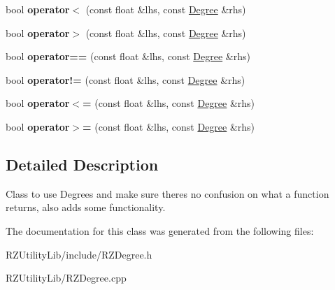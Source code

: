 \begin{DoxyCompactItemize}
\item 
\hypertarget{classrcz_engine_1_1_degree_a2efd712929fa4ee4616352fa5807cd17}{}bool {\bfseries operator$<$} (const float \&lhs, const \hyperlink{classrcz_engine_1_1_degree}{Degree} \&rhs)\label{classrcz_engine_1_1_degree_a2efd712929fa4ee4616352fa5807cd17}

\item 
\hypertarget{classrcz_engine_1_1_degree_a7eecb36960235c1f5b6e9d14a560b9e0}{}bool {\bfseries operator$>$} (const float \&lhs, const \hyperlink{classrcz_engine_1_1_degree}{Degree} \&rhs)\label{classrcz_engine_1_1_degree_a7eecb36960235c1f5b6e9d14a560b9e0}

\item 
\hypertarget{classrcz_engine_1_1_degree_a58046b347307c75d83bf84fe7f4f7163}{}bool {\bfseries operator==} (const float \&lhs, const \hyperlink{classrcz_engine_1_1_degree}{Degree} \&rhs)\label{classrcz_engine_1_1_degree_a58046b347307c75d83bf84fe7f4f7163}

\item 
\hypertarget{classrcz_engine_1_1_degree_af6076988772e4e8205d40ef0dfb4da25}{}bool {\bfseries operator!=} (const float \&lhs, const \hyperlink{classrcz_engine_1_1_degree}{Degree} \&rhs)\label{classrcz_engine_1_1_degree_af6076988772e4e8205d40ef0dfb4da25}

\item 
\hypertarget{classrcz_engine_1_1_degree_abc84808ef6d8b7052d00ebc9f472f537}{}bool {\bfseries operator$<$=} (const float \&lhs, const \hyperlink{classrcz_engine_1_1_degree}{Degree} \&rhs)\label{classrcz_engine_1_1_degree_abc84808ef6d8b7052d00ebc9f472f537}

\item 
\hypertarget{classrcz_engine_1_1_degree_a7c415e3af893572cb02eb39bcf3560f1}{}bool {\bfseries operator$>$=} (const float \&lhs, const \hyperlink{classrcz_engine_1_1_degree}{Degree} \&rhs)\label{classrcz_engine_1_1_degree_a7c415e3af893572cb02eb39bcf3560f1}

\end{DoxyCompactItemize}


\subsection{Detailed Description}
Class to use Degrees and make sure there\textquotesingle{}s no confusion on what a function returns, also adds some functionality. 

The documentation for this class was generated from the following files\+:\begin{DoxyCompactItemize}
\item 
R\+Z\+Utility\+Lib/include/R\+Z\+Degree.\+h\item 
R\+Z\+Utility\+Lib/R\+Z\+Degree.\+cpp\end{DoxyCompactItemize}
